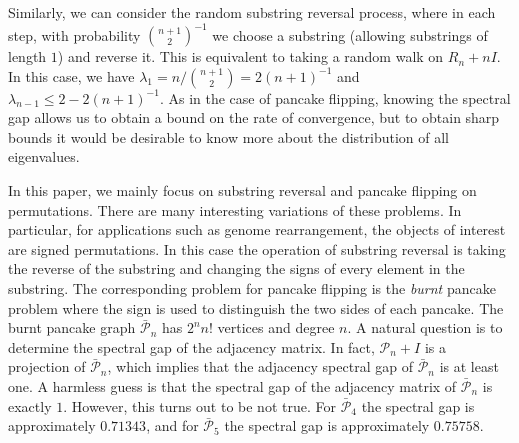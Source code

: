 Similarly, we can consider the random substring reversal process, where in each
step, with probability $\binom{n+1}{2}^{-1}$ we choose a substring (allowing substrings of length $1$) and reverse it.
This is equivalent to taking a random walk on $R_n+ nI$. 
In this case, we have $\lambda_1 = n/ \binom {n+1} 2= 2 (n+1)^{-1}$ and $\lambda_{n-1} \leq 2  - 2 (n+1)^{-1}$.   As in the case of 
pancake flipping, knowing the spectral gap allows us to obtain a bound on
the rate of convergence, but to obtain sharp bounds it would be desirable to
know more about the distribution of all eigenvalues.

In this paper, we mainly focus on substring reversal and pancake flipping on permutations. There are many interesting
variations of these problems. In particular, for applications such as genome rearrangement, the objects of interest are signed permutations.
In this case the operation of substring reversal is taking the reverse of the substring and changing the signs of every element in the substring. 
The corresponding problem for pancake flipping is the {\it burnt} pancake problem where the sign is used to distinguish the two sides of each pancake.
The burnt pancake graph $\bar{\mathcal P}_n$ has $2^n n!$ vertices and degree $n$.  A natural question is to determine the spectral gap of the
adjacency matrix.  In fact, $\mathcal{P}_n + I$ is a projection of $\bar{\mathcal{P}}_n$, which implies that the adjacency
spectral gap of $\bar{\mathcal{P}}_n$ is at least one.
A harmless guess is that the spectral gap of the adjacency matrix of $\bar{\mathcal P}_n$ is exactly $1$. However, this
turns out to be not true. For $\bar{\mathcal P}_4$ the spectral gap is approximately $0.71343$, and for $\bar{\mathcal P}_5$ the
spectral gap is approximately $0.75758$.  






